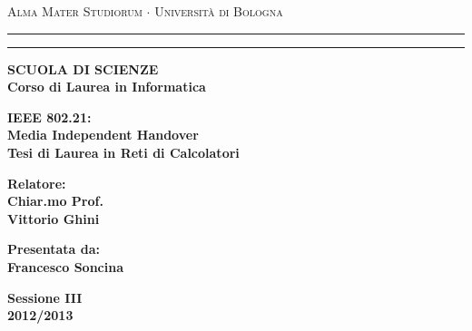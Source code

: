 \documentclass [a4paper,12pt]{book}
\begin{document}
\begin{titlepage}
\begin{center}
{{\Large{\textsc{Alma Mater Studiorum $\cdot$ Universit\`a di
Bologna}}}} \rule[0.1cm]{15.8cm}{0.1mm}
\rule[0.5cm]{15.8cm}{0.6mm}
{\small{\bf SCUOLA DI SCIENZE\\
Corso di Laurea in Informatica }}
\end{center}
\vspace{15mm}
\begin{center}
{\LARGE{\bf IEEE 802.21:}}\\
\vspace{3mm}
{\LARGE{\bf Media Independent Handover}}\\
\vspace{19mm} {\large{\bf Tesi di Laurea in Reti di Calcolatori}}
\end{center}
\vspace{40mm}
\par
\noindent
\begin{minipage}[t]{0.47\textwidth}
{\large{\bf Relatore:\\
Chiar.mo Prof.\\
Vittorio Ghini}}
\end{minipage}
\hfill
\begin{minipage}[t]{0.47\textwidth}\raggedleft
{\large{\bf Presentata da:\\
Francesco Soncina}}
\end{minipage}
\vspace{20mm}
\begin{center}
{\large{\bf Sessione III\\%
2012/2013 }}%
\end{center}
\end{titlepage}
\tableofcontents





\end{document}

